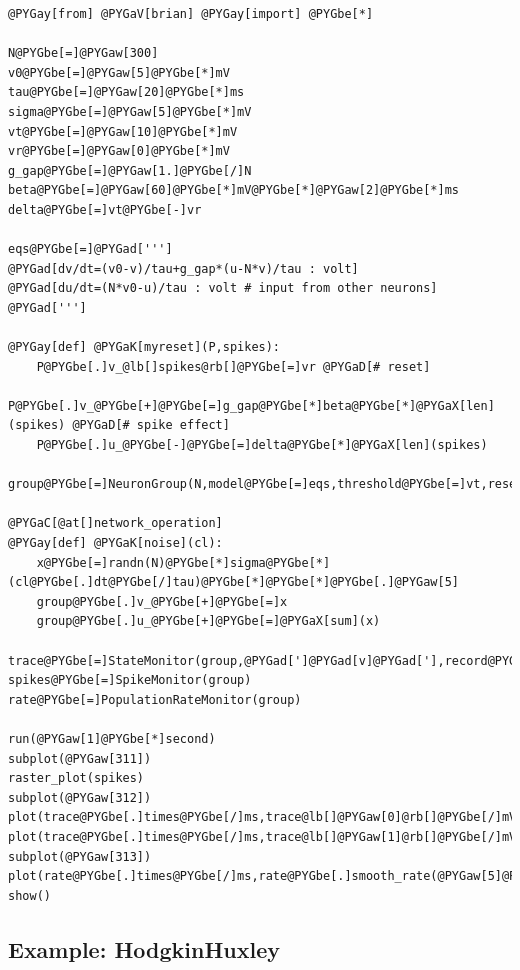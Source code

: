 \documentclass[letterpaper,10pt]{manual}
\begin{document}
\begin{Verbatim}[commandchars=@\[\]]
@PYGay[from] @PYGaV[brian] @PYGay[import] @PYGbe[*]

N@PYGbe[=]@PYGaw[300]
v0@PYGbe[=]@PYGaw[5]@PYGbe[*]mV
tau@PYGbe[=]@PYGaw[20]@PYGbe[*]ms
sigma@PYGbe[=]@PYGaw[5]@PYGbe[*]mV
vt@PYGbe[=]@PYGaw[10]@PYGbe[*]mV
vr@PYGbe[=]@PYGaw[0]@PYGbe[*]mV
g_gap@PYGbe[=]@PYGaw[1.]@PYGbe[/]N
beta@PYGbe[=]@PYGaw[60]@PYGbe[*]mV@PYGbe[*]@PYGaw[2]@PYGbe[*]ms
delta@PYGbe[=]vt@PYGbe[-]vr

eqs@PYGbe[=]@PYGad[''']
@PYGad[dv/dt=(v0-v)/tau+g_gap*(u-N*v)/tau : volt]
@PYGad[du/dt=(N*v0-u)/tau : volt # input from other neurons]
@PYGad[''']

@PYGay[def] @PYGaK[myreset](P,spikes):
    P@PYGbe[.]v_@lb[]spikes@rb[]@PYGbe[=]vr @PYGaD[# reset]
    P@PYGbe[.]v_@PYGbe[+]@PYGbe[=]g_gap@PYGbe[*]beta@PYGbe[*]@PYGaX[len](spikes) @PYGaD[# spike effect]
    P@PYGbe[.]u_@PYGbe[-]@PYGbe[=]delta@PYGbe[*]@PYGaX[len](spikes)

group@PYGbe[=]NeuronGroup(N,model@PYGbe[=]eqs,threshold@PYGbe[=]vt,reset@PYGbe[=]myreset)

@PYGaC[@at[]network_operation]
@PYGay[def] @PYGaK[noise](cl):
    x@PYGbe[=]randn(N)@PYGbe[*]sigma@PYGbe[*](cl@PYGbe[.]dt@PYGbe[/]tau)@PYGbe[*]@PYGbe[*]@PYGbe[.]@PYGaw[5]
    group@PYGbe[.]v_@PYGbe[+]@PYGbe[=]x
    group@PYGbe[.]u_@PYGbe[+]@PYGbe[=]@PYGaX[sum](x)

trace@PYGbe[=]StateMonitor(group,@PYGad[']@PYGad[v]@PYGad['],record@PYGbe[=]@lb[]@PYGaw[0],@PYGaw[1]@rb[])
spikes@PYGbe[=]SpikeMonitor(group)
rate@PYGbe[=]PopulationRateMonitor(group)

run(@PYGaw[1]@PYGbe[*]second)
subplot(@PYGaw[311])
raster_plot(spikes)
subplot(@PYGaw[312])
plot(trace@PYGbe[.]times@PYGbe[/]ms,trace@lb[]@PYGaw[0]@rb[]@PYGbe[/]mV)
plot(trace@PYGbe[.]times@PYGbe[/]ms,trace@lb[]@PYGaw[1]@rb[]@PYGbe[/]mV)
subplot(@PYGaw[313])
plot(rate@PYGbe[.]times@PYGbe[/]ms,rate@PYGbe[.]smooth_rate(@PYGaw[5]@PYGbe[*]ms)@PYGbe[/]Hz)
show()
\end{Verbatim}

\resetcurrentobjects
{}

\hypertarget{index-22}{}\subsection{Example: HodgkinHuxley}
\end{document}
